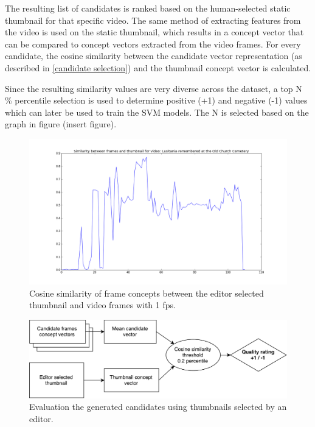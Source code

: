 \documentclass{../resources/sig-alternate-05-2015}
\begin{document}

The resulting list of candidates is ranked based on the human-selected static thumbnail for that specific video. The same method of extracting features from the video is used on the static thumbnail, which results in a concept vector that can be compared to concept vectors extracted from the video frames. For every candidate, the cosine similarity between the candidate vector representation (as described in \ref{candidate selection}) and the thumbnail concept vector is calculated. 

Since the resulting similarity values are very diverse across the dataset, a top N \% percentile selection is used to determine positive (+1) and negative (-1) values which can later be used to train the SVM models. The N is selected based on the graph in figure (insert figure).

\begin{figure}[h]
  \label{thumbnail similarity}
  \includegraphics[width=\linewidth]{resources/thumbnail-similarity}
  \caption{Cosine similarity of frame concepts between the editor selected thumbnail and video frames with 1 fps.}
\end{figure}

\begin{figure}[h]
  \label{candidate evaluation scheme}
  \includegraphics[width=\linewidth]{resources/candidate-evaluation}
  \caption{Evaluation the generated candidates using thumbnails selected by an editor.}
\end{figure}
\end{document}

